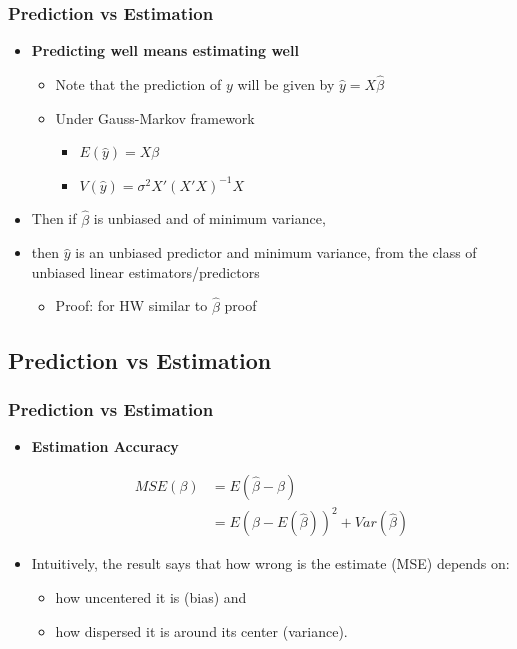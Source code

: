 \documentclass[
  shownotes,
  xcolor={svgnames},
  hyperref={colorlinks,citecolor=DarkBlue,linkcolor=DarkRed,urlcolor=DarkBlue}
  ]{beamer}
\begin{document}
\begin{frame}
\frametitle{Prediction vs Estimation}

\begin{itemize}
\item {\bf Predicting well means estimating well}

  \bigskip 
\begin{itemize}
  \item Note that the prediction of $y$ will be given by $\hat y=X \hat \beta$
  \bigskip 
  \item Under Gauss-Markov framework
  
  \begin{itemize}
    \item $E(\hat y) = X\beta$
    \medskip 
    \item $V(\hat y ) = \sigma^2 X' (X'X)^{-1} X$
  \end{itemize}
\end{itemize}

  \bigskip 

\item Then if $\hat \beta$ is unbiased and of minimum variance, 
\item then $\hat y$ is an unbiased predictor and minimum variance, from the class of unbiased linear estimators/predictors
  \begin{itemize}
    \tiny 
    \item Proof: for HW similar to $\hat \beta$ proof
  \end{itemize}
\end{itemize}
\end{frame}

\subsection{Prediction vs Estimation}
\begin{frame}
\frametitle{Prediction vs Estimation}

\begin{itemize}
\item {\bf Estimation Accuracy}

\begin{align}
  MSE(\beta) &= E(\hat \beta - \beta) \\
             &= E(\beta - E(\hat \beta))^2 + Var(\hat \beta) 
\end{align}

\item  Intuitively, the result says that how wrong is the estimate (MSE) depends on: 
\bigskip
  \begin{itemize}
  \item how uncentered it is (bias) and 
  \item how dispersed it is around its center (variance). 
  \end{itemize}
\end{itemize}

\end{frame}
\end{document}
